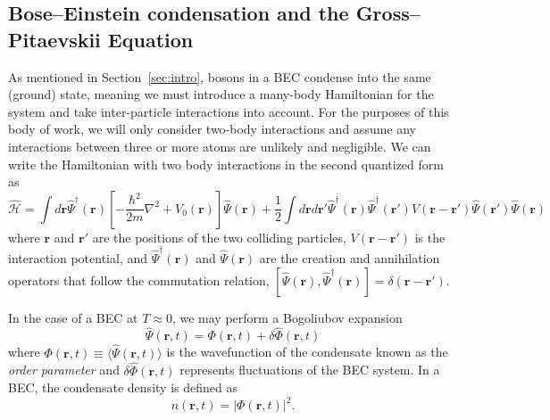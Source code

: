 \subsection{Bose--Einstein condensation and the Gross--Pitaevskii Equation}

As mentioned in Section~\ref{sec:intro}, bosons in a BEC condense into the same (ground) state, meaning we must introduce a many-body Hamiltonian for the system and take inter-particle interactions into account.
For the purposes of this body of work, we will only consider two-body interactions and assume any interactions between three or more atoms are unlikely and negligible.
We can write the Hamiltonian with two body interactions in the second quantized form as
\begin{equation}
    \mathcal{\hat H} = \int d\mathbf{r} \hat \Psi^\dagger(\mathbf{r})\left[-\frac{\hbar^2}{2m}\nabla^2 + V_0(\mathbf{r}) \right]\hat \Psi(\mathbf{r}) + \frac{1}{2} \int d\mathbf{r} d\mathbf{r'} \hat \Psi^\dagger(\mathbf{r}) \hat \Psi^\dagger(\mathbf{r'}) V(\mathbf{r} - \mathbf{r'})\hat \Psi(\mathbf{r'}) \hat \Psi(\mathbf{r})
    \label{eqn:2nd}
\end{equation}
where $\mathbf{r}$ and $\mathbf{r'}$ are the positions of the two colliding particles, $V(\mathbf{r}-\mathbf{r'})$ is the interaction potential, and $\hat \Psi^\dagger(\mathbf{r})$ and $\hat \Psi(\mathbf{r})$ are the creation and annihilation operators that follow the commutation relation, $[\hat \Psi(\mathbf{r}),\hat \Psi^\dagger(\mathbf{r})] = \delta(\mathbf{r} - \mathbf{r'})$.

In the case of a BEC at $T\approx0$, we may perform a Bogoliubov expansion~\cite{Bogoliubov1947, Dalfovo1999}
\begin{equation}
    \hat \Psi (\mathbf{r}, t) = \Phi(\mathbf{r},t) + \delta \hat \Phi(\mathbf{r},t)
\label{eqn:bog}
\end{equation}
where $\Phi(\mathbf{r},t) \equiv \langle \hat \Psi(\mathbf{r},t) \rangle$ is the wavefunction of the condensate known as the \textit{order parameter} and $\delta \hat \Phi(\mathbf{r},t)$ represents fluctuations of the BEC system.
In a BEC, the condensate density is defined as
\begin{equation}
    n(\mathbf{r},t) = |\Phi(\mathbf{r},t)|^2.
\end{equation}

